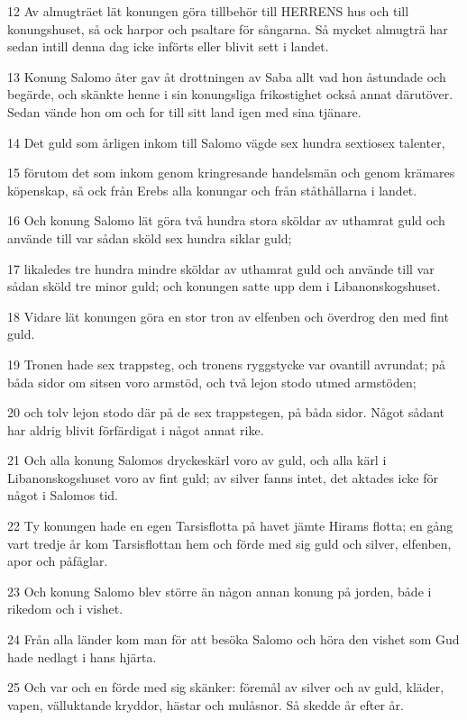 \par 12 Av almugträet lät konungen göra tillbehör till HERRENS hus och till konungshuset, så ock harpor och psaltare för sångarna. Så mycket almugträ har sedan intill denna dag icke införts eller blivit sett i landet.
\par 13 Konung Salomo åter gav åt drottningen av Saba allt vad hon åstundade och begärde, och skänkte henne i sin konungsliga frikostighet också annat därutöver. Sedan vände hon om och for till sitt land igen med sina tjänare.
\par 14 Det guld som årligen inkom till Salomo vägde sex hundra sextiosex talenter,
\par 15 förutom det som inkom genom kringresande handelsmän och genom krämares köpenskap, så ock från Erebs alla konungar och från ståthållarna i landet.
\par 16 Och konung Salomo lät göra två hundra stora sköldar av uthamrat guld och använde till var sådan sköld sex hundra siklar guld;
\par 17 likaledes tre hundra mindre sköldar av uthamrat guld och använde till var sådan sköld tre minor guld; och konungen satte upp dem i Libanonskogshuset.
\par 18 Vidare lät konungen göra en stor tron av elfenben och överdrog den med fint guld.
\par 19 Tronen hade sex trappsteg, och tronens ryggstycke var ovantill avrundat; på båda sidor om sitsen voro armstöd, och två lejon stodo utmed armstöden;
\par 20 och tolv lejon stodo där på de sex trappstegen, på båda sidor. Något sådant har aldrig blivit förfärdigat i något annat rike.
\par 21 Och alla konung Salomos dryckeskärl voro av guld, och alla kärl i Libanonskogshuset voro av fint guld; av silver fanns intet, det aktades icke för något i Salomos tid.
\par 22 Ty konungen hade en egen Tarsisflotta på havet jämte Hirams flotta; en gång vart tredje år kom Tarsisflottan hem och förde med sig guld och silver, elfenben, apor och påfåglar.
\par 23 Och konung Salomo blev större än någon annan konung på jorden, både i rikedom och i vishet.
\par 24 Från alla länder kom man för att besöka Salomo och höra den vishet som Gud hade nedlagt i hans hjärta.
\par 25 Och var och en förde med sig skänker: föremål av silver och av guld, kläder, vapen, välluktande kryddor, hästar och mulåsnor. Så skedde år efter år.
